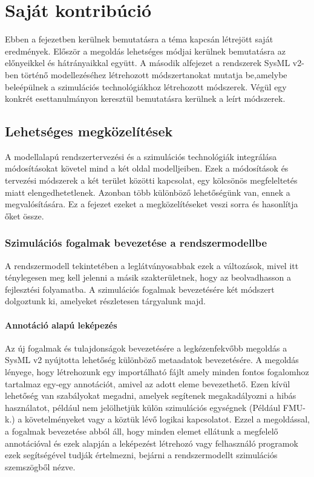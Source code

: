 \chapter{Saját kontribúció}
Ebben a fejezetben kerülnek bemutatásra a téma kapcsán létrejött saját eredmények. Először a megoldás lehetséges módjai kerülnek bemutatásra az előnyeikkel és hátrányaikkal együtt.
A második alfejezet a rendszerek SysML v2-ben történő modellezéséhez létrehozott módszertanokat mutatja be,amelybe beleépülnek a szimulációs technológiákhoz létrehozott módszerek.
Végül egy konkrét esettanulmányon keresztül bemutatásra kerülnek a leírt módszerek.

\section{Lehetséges megközelítések}
    A modellalapú rendszertervezési és a szimulációs technológiák integrálása módosításokat követel mind a két oldal modelljeiben.
    Ezek a módosítások és tervezési módszerek a két terület közötti kapcsolat, egy kölcsönös megfeleltetés miatt elengedhetetlenek.
    Azonban több különböző lehetőségünk van, ennek a megvalósítására.
    Ez a fejezet ezeket a megközelítéseket veszi sorra és hasonlítja őket össze.

    \subsection{Szimulációs fogalmak bevezetése a rendszermodellbe}
        A rendszermodell tekintetében a leglátványosabbak ezek a változások, mivel itt ténylegesen meg kell jelenni a másik szakterületnek, hogy az beolvadhasson a fejlesztési folyamatba.
        A szimulációs fogalmak bevezetésére két módszert dolgoztunk ki, amelyeket részletesen tárgyalunk majd.

        \subsubsection{Annotáció alapú leképezés}
        Az új fogalmak és tulajdonságok bevezetésére a legkézenfekvőbb megoldás a SysML v2 nyújtotta lehetőség különböző metaadatok bevezetésére.
        A megoldás lényege, hogy létrehozunk egy importálható fájlt amely minden fontos fogalomhoz tartalmaz egy-egy annotációt, amivel az adott eleme bevezethető.
        Ezen kívül lehetőség van szabályokat megadni, amelyek segítenek megakadályozni a hibás használatot, például nem jelölhetjük külön szimulációs egységnek (Például FMU-k.) a követelményeket vagy a köztük lévő logikai kapcsolatot.
        Ezzel a megoldással, a fogalmak bevezetése abból áll, hogy minden elemet ellátunk a megfelelő annotációval és ezek alapján a leképezést létrehozó vagy felhasználó programok ezek segítségével tudják értelmezni, bejárni a rendszermodellt szimulációs szemszögből nézve.

